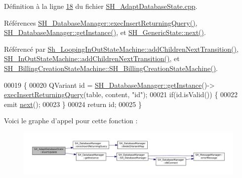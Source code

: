 Définition à la ligne \hyperlink{SH__AdaptDatabaseState_8cpp_source_l00018}{18} du fichier \hyperlink{SH__AdaptDatabaseState_8cpp_source}{S\-H\-\_\-\-Adapt\-Database\-State.\-cpp}.



Références \hyperlink{classSH__DatabaseManager_a1c0399265021ed79a1c07a0e01c7a5dc}{S\-H\-\_\-\-Database\-Manager\-::exec\-Insert\-Returning\-Query()}, \hyperlink{classSH__DatabaseManager_a638369a15265ab0aa053080a32d2ca39}{S\-H\-\_\-\-Database\-Manager\-::get\-Instance()}, et \hyperlink{classSH__GenericState_a030e67a872956135c52e6876d960a7b5}{S\-H\-\_\-\-Generic\-State\-::next()}.



Référencé par \hyperlink{classSh__LoopingInOutStateMachine_acfd8d0711c793b13c759f6c50be6a315}{Sh\-\_\-\-Looping\-In\-Out\-State\-Machine\-::add\-Children\-Next\-Transition()}, \hyperlink{classSH__InOutStateMachine_a689e5513ef6ef3fc1598efacd413372e}{S\-H\-\_\-\-In\-Out\-State\-Machine\-::add\-Children\-Next\-Transition()}, et \hyperlink{classSH__BillingCreationStateMachine_ad62b77fa4aeafe200056ff3974562f83}{S\-H\-\_\-\-Billing\-Creation\-State\-Machine\-::\-S\-H\-\_\-\-Billing\-Creation\-State\-Machine()}.


\begin{DoxyCode}
00019 \{
00020     QVariant \textcolor{keywordtype}{id} = \hyperlink{classSH__DatabaseManager_a638369a15265ab0aa053080a32d2ca39}{SH\_DatabaseManager::getInstance}()->
      \hyperlink{classSH__DatabaseManager_a1c0399265021ed79a1c07a0e01c7a5dc}{execInsertReturningQuery}(table, content, \textcolor{stringliteral}{"id"});
00021     \textcolor{keywordflow}{if}(\textcolor{keywordtype}{id}.isValid()) \{
00022         emit \hyperlink{classSH__GenericState_a030e67a872956135c52e6876d960a7b5}{next}();
00023     \}
00024     \textcolor{keywordflow}{return} id;
00025 \}
\end{DoxyCode}


Voici le graphe d'appel pour cette fonction \-:
\nopagebreak
\begin{figure}[H]
\begin{center}
\leavevmode
\includegraphics[width=350pt]{classSH__AdaptDatabaseState_ab010e64da052db416328d3bcb9ca01d4_cgraph}
\end{center}
\end{figure}




